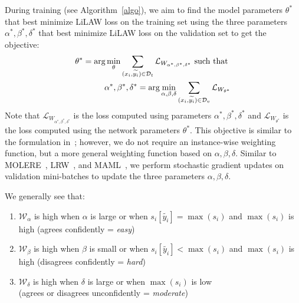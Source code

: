 \documentclass{article}
\theoremstyle{plain}
\theoremstyle{definition}
\theoremstyle{remark}
\begin{document}
During training (see Algorithm~\ref{algo}), we aim to find the model parameters $\theta^*$ that best minimize LiLAW loss on the training set using the three parameters $\alpha^*, \beta^*, \delta^*$ that best minimize LiLAW loss on the validation set to get the objective:
\vspace{-0.5em}
\begin{align}
    \displaystyle\theta^* = \arg\min_{\theta} \sum_{(x_i, \widetilde{y_i}) \in \mathcal{D}_{t}}\mathcal{L}_{W_{\alpha^*, \beta^*, \delta^*}} \text{ such that } \\
    \alpha^*, \beta^*, \delta^* = \displaystyle\arg\min_{\alpha, \beta, \delta} \sum_{(x_i, \widetilde{y_i}) \in \mathcal{D}_{v}}\mathcal{L}_{W_{\theta^*}}
    \vspace{-2em}
\end{align}
Note that $\mathcal{L}_{W_{\alpha^*, \beta^*, \delta^*}}$ is the loss computed using parameters $\alpha^*, \beta^*, \delta^*$ and $\mathcal{L}_{W_{\theta^*}}$ is the loss computed using the network parameters $\theta^*$. This objective is similar to the formulation in~\citet{jain_improving_2024}; however, we do not require an instance-wise weighting function, but a more general weighting function based on $\alpha, \beta, \delta$. 
Similar to MOLERE~\citep{jain_improving_2024}, LRW~\citep{ren_learning_2019}, and MAML~\citep{finn_model-agnostic_2017}, we perform stochastic gradient updates on validation mini-batches to update the three parameters $\alpha, \beta, \delta$.

We generally see that:
\vspace{-1em}
\begin{enumerate}[leftmargin=*,labelindent=0pt,label=\textbf{--}]
    \itemsep-0.2em 
    \item $\mathcal{W}_\alpha$ is high when $\alpha$ is large or when $s_i[\widetilde{y_i}] = \max(s_i)$ and $\max(s_i)$ is high (agrees confidently = \textit{easy})
    \item $\mathcal{W}_\beta$ is high when $\beta$ is small or when $s_i[\widetilde{y_i}] < \max(s_i)$ and $\max(s_i)$ is high (disagrees confidently = \textit{hard})
    \item $\mathcal{W}_\delta$ is high when $\delta$ is large or when $\max(s_i)$ is low \\(agrees or disagrees unconfidently = \textit{moderate})
\end{enumerate}
\end{document}

